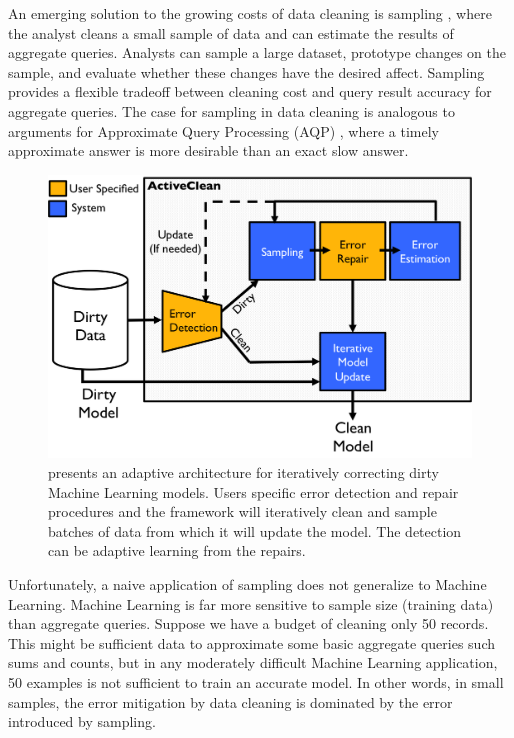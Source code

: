 An emerging solution to the growing costs of data cleaning is sampling \cite{wang1999sample}, where the analyst cleans a small sample of data and can estimate the results of aggregate queries.
Analysts can sample a large dataset, prototype changes on the sample, and evaluate whether these changes have the desired affect.
Sampling provides a flexible tradeoff between cleaning cost and query result accuracy for aggregate queries.
The case for sampling in data cleaning is analogous to arguments for Approximate Query Processing (AQP) \cite{DBLP:conf/eurosys/AgarwalMPMMS13}, where a timely approximate answer is more desirable than an exact slow answer. 

\begin{figure}[t]
\centering
 \includegraphics[width=0.8\columnwidth]{figs/arch.png}
 \caption{\sysfull presents an adaptive architecture for iteratively correcting dirty Machine Learning models. Users specific error detection and repair procedures and the framework will iteratively clean and sample batches of data from which it will update the model. The detection can be adaptive learning from the repairs. \label{sys-arch}}\vspace{-2em}
\end{figure}

Unfortunately, a naive application of sampling does not generalize to Machine Learning.
Machine Learning is far more sensitive to sample size (training data) than aggregate queries.
Suppose we have a budget of cleaning only 50 records.
This might be sufficient data to approximate some basic aggregate queries such sums and counts, but in any moderately difficult Machine Learning application, 50 examples is not sufficient to train an accurate model.
In other words, in small samples, the error mitigation by data cleaning is dominated by the error introduced by sampling.

